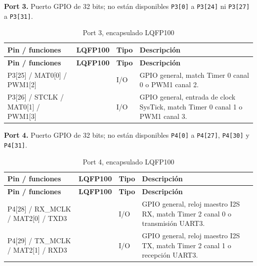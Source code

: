 ﻿\documentclass[11pt]{article}
\begin{document}
\noindent\textbf{Port 3.} Puerto GPIO de 32 bits; no están disponibles \texttt{P3[0]} a \texttt{P3[24]} ni \texttt{P3[27]} a \texttt{P3[31]}.

\begin{longtable}{|>{\raggedright\arraybackslash}p{}|>{\raggedright\arraybackslash}p{}|>{\raggedright\arraybackslash}p{}|>{\raggedright\arraybackslash}p{}|}
\caption{Port 3, encapsulado LQFP100}\\
\hline
\textbf{Pin / funciones} & \textbf{LQFP100} & \textbf{Tipo} & \textbf{Descripción} \\
\hline
\endfirsthead
\hline
\textbf{Pin / funciones} & \textbf{LQFP100} & \textbf{Tipo} & \textbf{Descripción} \\
\hline
\endhead
P3[25] / MAT0[0] / PWM1[2] & 27 & I/O & GPIO general, match Timer 0 canal 0 o PWM1 canal 2. \\
\hline
P3[26] / STCLK / MAT0[1] / PWM1[3] & 26 & I/O & GPIO general, entrada de clock SysTick, match Timer 0 canal 1 o PWM1 canal 3. \\
\hline
\end{longtable}

\noindent\textbf{Port 4.} Puerto GPIO de 32 bits; no están disponibles \texttt{P4[0]} a \texttt{P4[27]}, \texttt{P4[30]} y \texttt{P4[31]}.

\begin{longtable}{|>{\raggedright\arraybackslash}p{}|>{\raggedright\arraybackslash}p{}|>{\raggedright\arraybackslash}p{}|>{\raggedright\arraybackslash}p{}|}
\caption{Port 4, encapsulado LQFP100}\\
\hline
\textbf{Pin / funciones} & \textbf{LQFP100} & \textbf{Tipo} & \textbf{Descripción} \\
\hline
\endfirsthead
\hline
\textbf{Pin / funciones} & \textbf{LQFP100} & \textbf{Tipo} & \textbf{Descripción} \\
\hline
\endhead
P4[28] / RX\_MCLK / MAT2[0] / TXD3 & 82 & I/O & GPIO general, reloj maestro I2S RX, match Timer 2 canal 0 o transmisión UART3. \\
\hline
P4[29] / TX\_MCLK / MAT2[1] / RXD3 & 85 & I/O & GPIO general, reloj maestro I2S TX, match Timer 2 canal 1 o recepción UART3. \\
\hline
\end{longtable}
\end{document}
